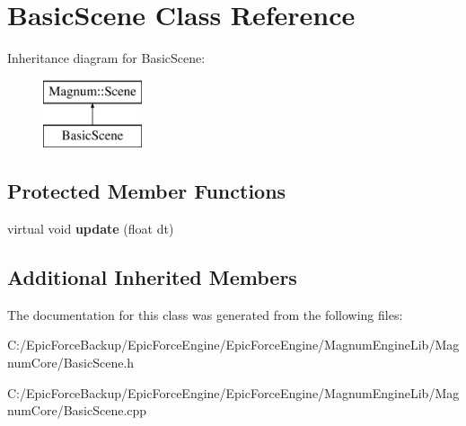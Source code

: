 \hypertarget{class_basic_scene}{}\section{Basic\+Scene Class Reference}
\label{class_basic_scene}
Inheritance diagram for Basic\+Scene\+:\begin{figure}[H]
\begin{center}
\leavevmode
\includegraphics[height=2.000000cm]{class_basic_scene}
\end{center}
\end{figure}
\subsection*{Protected Member Functions}
\begin{DoxyCompactItemize}
\item 
virtual void {\bfseries update} (float dt)\hypertarget{class_basic_scene_a382ad979e86dba40181b6ca906b99315}{}\label{class_basic_scene_a382ad979e86dba40181b6ca906b99315}

\end{DoxyCompactItemize}
\subsection*{Additional Inherited Members}


The documentation for this class was generated from the following files\+:\begin{DoxyCompactItemize}
\item 
C\+:/\+Epic\+Force\+Backup/\+Epic\+Force\+Engine/\+Epic\+Force\+Engine/\+Magnum\+Engine\+Lib/\+Magnum\+Core/Basic\+Scene.\+h\item 
C\+:/\+Epic\+Force\+Backup/\+Epic\+Force\+Engine/\+Epic\+Force\+Engine/\+Magnum\+Engine\+Lib/\+Magnum\+Core/Basic\+Scene.\+cpp\end{DoxyCompactItemize}
